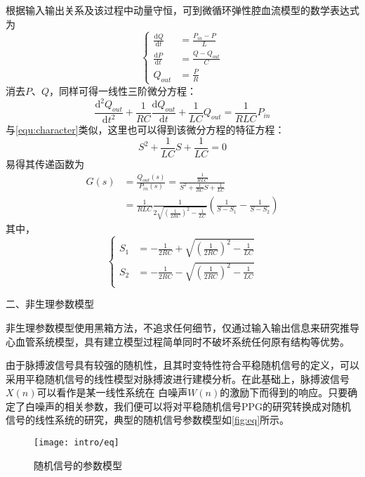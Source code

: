 根据输入输出关系及该过程中动量守恒，可到微循环弹性腔血流模型的数学表达式为
\begin{equation}
    \label{equ:wxh1}
    \left \{
    \begin{aligned}
        \frac{\mathrm{d} Q}{\mathrm{d} t} &=\frac{P_{in}-P}{L}\\
        \frac{\mathrm{d} P}{\mathrm{d} t} &=\frac{Q-Q_{out}}{C}\\
        Q_{out} &=\frac{P}{R}
    \end{aligned}
    \right.
\end{equation}
消去$P$、$Q$，同样可得一线性三阶微分方程：
\begin{equation}
    \label{equ:wxh2}
    \frac{\mathrm{d^2} Q_{out}}{\mathrm{d} t^2}+\frac{1}{RC}\frac{\mathrm{d} Q_{out}}{\mathrm{d} t}+\frac{1}{LC}Q_{out}=\frac{1}{RLC}P_{in}
\end{equation}
与\autoref{equ:character}类似，这里也可以得到该微分方程的特征方程：
\begin{equation}
    \label{equ:character2}
    S^2+\frac{1}{LC}S+\frac{1}{LC}=0
\end{equation}
易得其传递函数为
\begin{equation}
    \label{equ:hs}
    \begin{aligned}
    G(s) &=\frac{Q_{out}(s)}{P_{in}(s)}=\frac{\frac{1}{RLC}}{S^2+\frac{1}{RC}S+\frac{1}{LC}} \\
    &=\frac{1}{RLC}\frac{1}{2\sqrt{(\frac{1}{2RC})^2-\frac{1}{LC}}}(\frac{1}{S-S_{1}}-\frac{1}{S-S_{2}})
    \end{aligned}
\end{equation}
其中，
\begin{equation}
    \label{equ:ss}
    \left \{
    \begin{aligned}
        S_{1} &= -\frac{1}{2RC}+\sqrt{(\frac{1}{2RC})^2-\frac{1}{LC}}\\
        S_{2} &= -\frac{1}{2RC}-\sqrt{(\frac{1}{2RC})^2-\frac{1}{LC}}\\
    \end{aligned}
    \right.
\end{equation}

二、非生理参数模型

非生理参数模型使用黑箱方法，不追求任何细节，仅通过输入输出信息来研究推导心血管系统模型，具有建立模型过程简单同时不破坏系统任何原有结构等优势。

由于脉搏波信号具有较强的随机性，且其时变特性符合平稳随机信号的定义，可以采用平稳随机信号的线性模型对脉搏波进行建模分析\cite{Qiu2012,PPGYY,Ma2015}。在此基础上，脉搏波信号$X(n)$可以看作是某一线性系统在
白噪声$W(n)$的激励下而得到的响应。只要确定了白噪声的相关参数，我们便可以将对平稳随机信号PPG的研究转换成对随机信号的线性系统的研究，典型的随机信号参数模型如\autoref{fig:eq}所示。
\begin{figure}[htbp]
    \centering
    \texttt{[image: intro/eq]}
    \caption{\label{fig:eq}随机信号的参数模型}
\end{figure}

